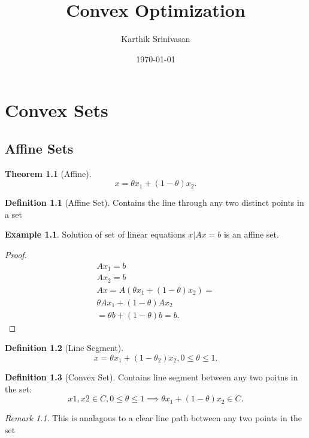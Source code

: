 \documentclass{report}
\title{\Huge{Convex Optimization}}
\author{\huge{Karthik Srinivasan}}
\date{\today}
\newtheorem{theorem}{Theorem}[section]
\theoremstyle{remark} \newtheorem{remark}{Remark}[section]
\theoremstyle{definition}
\newtheorem{definition}{Definition}[section]
\theoremstyle{definition}
\newtheorem{example}{Example}[section]
\theoremstyle{definition}
\theoremstyle{remark}
\begin{document}
\maketitle
\newpage
\tableofcontents

\chapter{Convex Sets}

\section{Affine Sets}

\begin{theorem}[Affine]
    \[
    x = \theta x_1 + (1 - \theta)x_2
    .\] 
\end{theorem}

\begin{definition}[Affine Set]
    Contains the line through any two distinct points in a set
       
\end{definition}


\begin{example}
    Solution of set of linear equations ${x | Ax = b}$ is an affine set. 
\end{example}

\begin{proof}
    \begin{align*}
        Ax_1 = b \\
        Ax_2 = b \\
        Ax = A(\theta x_1 + (1-\theta)x_2) = \\
        \theta Ax_1 + (1-\theta)Ax_2 \\
        = \theta b + (1-\theta)b = b
    .\end{align*}
\end{proof}

\begin{definition}[Line Segment]
    \[
    x = \theta x_1 + (1-\theta_2)x_2, 0 \le \theta \le 1
    .\] 
\end{definition}

\begin{definition}[Convex Set]
      Contains line segment between any two poitns in the set:
      \[
          x1,x2 \in C, 0 \le \theta \le 1 \implies \theta x_1 + (1-\theta)x_2 \in C
      .\] 
\end{definition}


\begin{remark}
    This is analagous to a clear line path between any two points in the set   
\end{remark}
\end{document}
